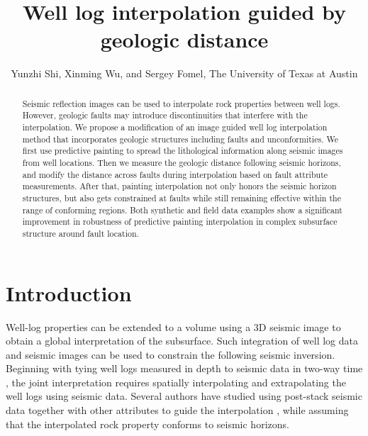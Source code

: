 
\title{Well log interpolation guided by geologic distance}

\author{Yunzhi Shi, Xinming Wu, and Sergey Fomel, The University of Texas at Austin}

\maketitle


\begin{abstract}
Seismic reflection images can be used to interpolate rock properties between well logs.
However, geologic faults may introduce discontinuities that interfere with the interpolation.
We propose a modification of an image guided well log interpolation method that incorporates geologic structures including faults and unconformities.
We first use predictive painting to spread the lithological information along seismic images from well locations.
Then we measure the geologic distance following seismic horizons, and modify the distance across faults during interpolation based on fault attribute measurements.
After that, painting interpolation not only honors the seismic horizon structures, but also gets constrained at faults while still remaining effective within the range of conforming regions.
Both synthetic and field data examples show a significant improvement in robustness of predictive painting interpolation in complex subsurface structure around fault location.
\end{abstract}

\section{Introduction}
Well-log properties can be extended to a volume using a 3D seismic image to obtain a global interpretation of the subsurface.
Such integration of well log data and seismic images can be used to constrain the following seismic inversion.
Beginning with tying well logs measured in depth to seismic data in two-way time \cite[]{wu}, the joint interpretation requires spatially interpolating and extrapolating the well logs using seismic data.
Several authors have studied using post-stack seismic data together with other attributes to guide the interpolation \cite[]{taner,schultz,hampson}, while assuming that the interpolated rock property conforms to seismic horizons.

